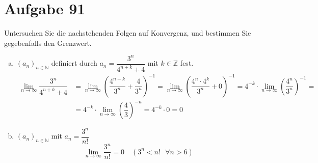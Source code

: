 \section{Aufgabe 91}
\setcounter{section}{91}

Untersuchen Sie die nachstehenden Folgen auf Konvergenz, und bestimmen Sie
gegebenfalls den Grenzwert.
\begin{enumerate}[(a)]
    \item $(a_n)_{n \in \mathbb{N}}$ definiert durch $a_n = \dfrac{3^n}{4^{n +
        k} + 4}$ mit $k \in \mathbb{Z}$ fest.
        \begin{align*}
            \lim\limits_{n\rightarrow\infty}\dfrac{3^n}{4^{n + k} + 4} &= \lim\limits_{n\rightarrow\infty}\left(\dfrac{4^{n + k}}{3^n} + \dfrac{4}{3^n}\right)^{-1} = \lim\limits_{n\rightarrow\infty}\left(\dfrac{4^n \cdot 4^k}{3^n} + 0\right)^{-1} = 4^{-k} \cdot \lim\limits_{n\rightarrow\infty}\left(\dfrac{4^n}{3^n}\right)^{-1} = \\[10pt]
                                                                       &= 4^{-k} \cdot \lim\limits_{n\rightarrow\infty}\left(\dfrac{4}{3}\right)^{-n} = 4^{-k} \cdot 0 = 0
        \end{align*}

    \item $(a_n)_{n \in \mathbb{N}}$ mit $a_n = \dfrac{3^n}{n!}$
        \begin{equation*}
            \lim\limits_{n\rightarrow\infty}\dfrac{3^n}{n!} = 0 \quad (3^n < n!\text{ }\forall n > 6)
        \end{equation*}
\end{enumerate}
